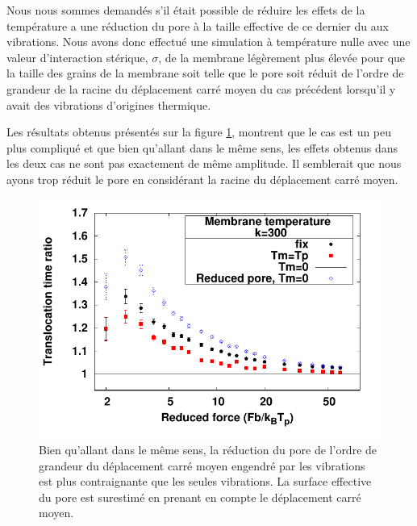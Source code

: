 \newpage

Nous nous sommes demandés s'il était possible de réduire les effets de la température a une réduction du pore à la taille effective de ce dernier du aux vibrations. Nous avons donc effectué une simulation à température nulle avec une valeur d'interaction stérique, $\sigma$, de la membrane légèrement plus élevée pour que la taille des grains de la membrane soit telle que le pore soit réduit de l'ordre de grandeur de la racine du déplacement carré moyen du cas précédent lorsqu'il y avait des vibrations d'origines thermique.
 
Les résultats obtenus présentés sur la figure \ref{reducedpore}, montrent que le cas est un peu plus compliqué et que bien qu'allant dans le même sens, les effets obtenus dans les deux cas ne sont pas exactement de même amplitude. Il semblerait que nous ayons trop réduit le pore en considérant la racine du déplacement carré moyen.


\begin{figure}[H]
\begin{center}
\includegraphics[width=\textwidth]{compkstandarttonotempdifferenttempnew.pdf} 

\caption[Equivalence entre vibrations et pore réduit ?]{Bien qu'allant dans le même sens, la réduction du pore de l'ordre de grandeur du déplacement carré moyen engendré par les vibrations est plus contraignante que les seules vibrations. La surface effective du pore est surestimé en prenant en compte le déplacement carré moyen.}
\label{reducedpore}
\end{center}
\end{figure}

